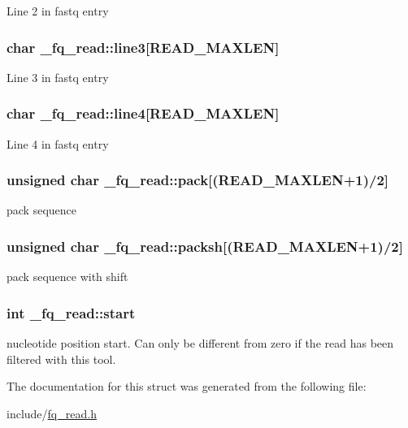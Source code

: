 Line 2 in fastq entry \hypertarget{struct__fq__read_a3df48e8dc31e47dc36c371002dba1bb5}{
\subsubsection[{line3}]{\setlength{\rightskip}{0pt plus 5cm}char \+\_\+fq\+\_\+read\+::line3\mbox{[}R\+E\+A\+D\+\_\+\+M\+A\+X\+L\+E\+N\mbox{]}}}\label{struct__fq__read_a3df48e8dc31e47dc36c371002dba1bb5}
Line 3 in fastq entry \hypertarget{struct__fq__read_a8074fd734cb7e3d4b87454417aea569a}{
\subsubsection[{line4}]{\setlength{\rightskip}{0pt plus 5cm}char \+\_\+fq\+\_\+read\+::line4\mbox{[}R\+E\+A\+D\+\_\+\+M\+A\+X\+L\+E\+N\mbox{]}}}\label{struct__fq__read_a8074fd734cb7e3d4b87454417aea569a}
Line 4 in fastq entry \hypertarget{struct__fq__read_afd023930012710b1a015ef78a02b3721}{
\subsubsection[{pack}]{\setlength{\rightskip}{0pt plus 5cm}unsigned char \+\_\+fq\+\_\+read\+::pack\mbox{[}(R\+E\+A\+D\+\_\+\+M\+A\+X\+L\+E\+N+1)/2\mbox{]}}}\label{struct__fq__read_afd023930012710b1a015ef78a02b3721}
pack sequence \hypertarget{struct__fq__read_a8c9786c5779078561abe5ec2e06c7ff9}{
\subsubsection[{packsh}]{\setlength{\rightskip}{0pt plus 5cm}unsigned char \+\_\+fq\+\_\+read\+::packsh\mbox{[}(R\+E\+A\+D\+\_\+\+M\+A\+X\+L\+E\+N+1)/2\mbox{]}}}\label{struct__fq__read_a8c9786c5779078561abe5ec2e06c7ff9}
pack sequence with shift \hypertarget{struct__fq__read_a0b8deb6c25c72026b4928b17e3f12ade}{
\subsubsection[{start}]{\setlength{\rightskip}{0pt plus 5cm}int \+\_\+fq\+\_\+read\+::start}}\label{struct__fq__read_a0b8deb6c25c72026b4928b17e3f12ade}
nucleotide position start. Can only be different from zero if the read has been filtered with this tool. 

The documentation for this struct was generated from the following file\+:\begin{DoxyCompactItemize}
\item 
include/\hyperlink{fq__read_8h}{fq\+\_\+read.\+h}\end{DoxyCompactItemize}
